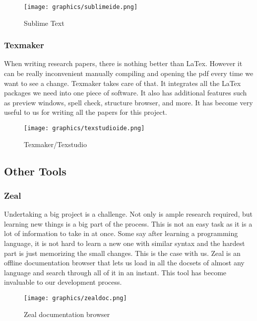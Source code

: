 \documentclass[letterpaper, 12pt]{article}
\begin{document}
\begin{figure}
    \centering
	\texttt{[image: graphics/sublimeide.png]}
    \caption{Sublime Text}
\end{figure}


\newpage

\subsubsection{Texmaker}
When writing research papers, there is nothing better than LaTex. However it can be really
inconvenient manually compiling and opening the pdf every time we want to see a change.
Texmaker takes care of that. It integrates all the LaTex packages we need into one piece
of software. It also has additional features such as preview windows, spell check,
structure browser, and more. It has become very useful to us for writing all the
papers for this project.

\begin{figure}
    \centering
	\texttt{[image: graphics/texstudioide.png]}
    \caption{Texmaker/Texstudio}
\end{figure}

\newpage

\subsection{Other Tools}

\subsubsection{Zeal}
Undertaking a big project is a challenge. Not only is ample research required, but learning
new things is a big part of the process. This is not an easy task as it is a lot of information
to take in at once. Some say after learning a programming language, it is not hard to learn a
new one with similar syntax and the hardest part is just memorizing the small changes. This
is the case with us. Zeal is an offline documentation browser that lets us load in all
the docsets of almost any language and search through all of it in an instant. This tool
has become invaluable to our development process.

\begin{figure}
    \centering
	\texttt{[image: graphics/zealdoc.png]}
    \caption{Zeal documentation browser}
\end{figure}

\newpage
\end{document}

